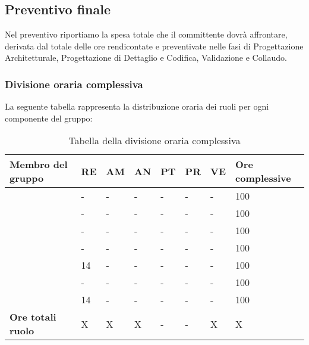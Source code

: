 \subsection{Preventivo finale} 
Nel preventivo riportiamo la spesa totale che il committente dovrà affrontare, derivata dal totale delle ore rendicontate e preventivate nelle fasi di Progettazione Architetturale, Progettazione di Dettaglio e Codifica, Validazione e Collaudo.

\subsubsection{Divisione oraria complessiva} 
La seguente tabella rappresenta la distribuzione oraria dei ruoli per ogni componente del gruppo:
{
\renewcommand{\arraystretch}{2}
\begin{longtable}[h!] { C{4cm} C{1cm} C{1cm} C{1cm} C{1cm} C{1cm} C{1cm} C{3cm}}
\caption{Tabella della divisione oraria complessiva}	\\
\rowcolor{\primaryColor}

\textcolor{\secondaryColor}{\textbf{Membro del gruppo}} & 
\textcolor{\secondaryColor}{\textbf{RE}} & 
\textcolor{\secondaryColor}{\textbf{AM}} & 
\textcolor{\secondaryColor}{\textbf{AN}} & 
\textcolor{\secondaryColor}{\textbf{PT}} & 
\textcolor{\secondaryColor}{\textbf{PR}} & 
\textcolor{\secondaryColor}{\textbf{VE}} & 
\textcolor{\secondaryColor}{\textbf{Ore complessive}}\\	
\endhead

\AW{}                     &  - &  - &  - & - & - & - & 100 \\
\AT{}                     &  - &  - & - & - & - & - & 100 \\
\AD{}                     &  - &  - &  - & - & - & - & 100 \\
\EC{}                     &  - &  - &  - & - & - & - & 100 \\
\EM{}                     &  14 & - &  - & - & - & - & 100 \\
\FP{}                     &  - &  - &  - & - & - & - & 100 \\
\GG{}                     &  14 &  - &  - & - & - & - & 100 \\
\textbf{Ore totali ruolo} & X & X & X & - & - & X & X \\
\end{longtable}
}

